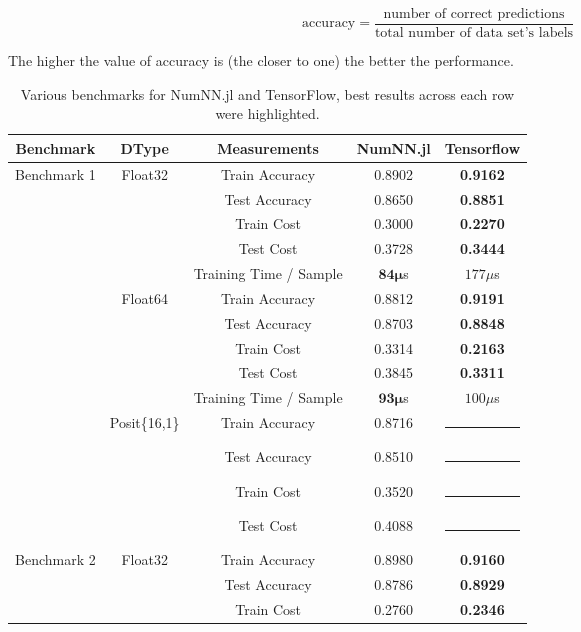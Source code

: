 \begin{equation}
\textrm{accuracy} = \frac{\textrm{number of correct predictions}}{\textrm{total number of data set's labels}}
\end{equation}

The higher the value of accuracy is (the closer to one) the better the performance.


\begin{table}[!htbp]
	\centering
	\renewcommand{\arraystretch}{1.1}
	\caption{Various benchmarks for NumNN.jl and TensorFlow, best results across each row were highlighted.}\label{tab:bench}
	\begin{tabular}{|c | c | c || c | c |}
		\hline
		Benchmark & DType & Measurements & NumNN.jl & Tensorflow\\\hline\hline
		\multirow{14}{*}{Benchmark 1} & \multirow{5}{*}{Float32} & Train Accuracy & 0.8902 & \textbf{0.9162}\\
		& & Test Accuracy & 0.8650 & \textbf{0.8851}\\
		& & Train Cost & 0.3000 & \textbf{0.2270}\\
		& & Test Cost & 0.3728 & \textbf{0.3444}\\
		& & Training Time / Sample & \textbf{$\mathbf{84\mu}$}s  & $177\mu$s\\\cline{2-5}
		& \multirow{5}{*}{Float64} & Train Accuracy & 0.8812 & \textbf{0.9191} \\
		& & Test Accuracy & 0.8703 & \textbf{0.8848} \\
		& & Train Cost & 0.3314 & \textbf{0.2163} \\
		& & Test Cost & 0.3845 & \textbf{0.3311} \\
		& & Training Time / Sample & \textbf{$\mathbf{93\mu}$}s & $100\mu$s\\\cline{2-5}
		& \multirow{4}{*}{Posit\{16,1\}} & Train Accuracy & 0.8716 & \rule{5em}{1pt} \\
		& & Test Accuracy & 0.8510 & \rule{5em}{1pt} \\
		& & Train Cost & 0.3520 & \rule{5em}{1pt} \\
		& & Test Cost & 0.4088 & \rule{5em}{1pt} \\\hline
		\multirow{14}{*}{Benchmark 2\footref{batchnorm}} & \multirow{5}{*}{Float32} & Train Accuracy & 0.8980 & \textbf{0.9160}\\
		& & Test Accuracy & 0.8786 & \textbf{0.8929}\\
		& & Train Cost & 0.2760 & \textbf{0.2346}\\

\end{tabular}
\end{table}
